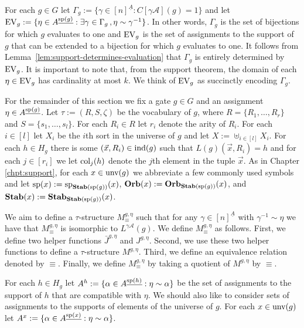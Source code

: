 \documentclass[../main/thesis.tex]{subfiles}
\begin{document}
For each $g \in G$ let $\Gamma_g:= \{\gamma \in [n]^{\underline{A}} : C[\gamma
\mathcal{A}](g) = 1 \}$ and let $\text{EV}_g := \{ \eta \in A^{\underline{\text{sp}(g)}}
: \exists \gamma \in \Gamma_g \, ,\eta \sim \gamma^{-1}\}$. In other words,
$\Gamma_g$ is the set of bijections for which $g$ evaluates to one and $\text{EV}_g$
is the set of assignments to the support of $g$ that can be extended to a
bijection for which $g$ evaluates to one. It follows from
Lemma~\ref{lem:support-determines-evaluation} that $\Gamma_g$ is entirely
determined by $\text{EV}_g$. It is important to note that, from the support theorem,
the domain of each $\eta \in \text{EV}_g$ has cardinality at most $k$. We think of
$\text{EV}_g$ as succinctly encoding $\Gamma_g$.

For the remainder of this section we fix a gate $g \in G$ and an assignment
$\eta \in A^{\underline{\text{sp}(g)}}$. Let $\tau := (R, S, \zeta)$ be the
vocabulary of $g$, where $R = \{R_1, \ldots, R_r\}$ and $S = \{s_1, \ldots,
s_l\}$. For each $R_i \in R$ let $r_i$ denote the arity of $R_i$. For each $i
\in [l]$ let $X_i$ be the $i$th sort in the universe of $g$ and let $X :=
\uplus_{i \in [l]}X_i$. For each $h \in H_g$ there is some $(\vec{x}, R_i) \in
\text{\upshape ind}(g)$ such that $L(g)(\vec{x}, R_i) = h$ and for each $j \in [r_i]$ we let
$\text{\upshape col}_{j}(h)$ denote the $j$th element in the tuple $\vec{x}$. As in Chapter
\ref{chpt:support}, for each $x \in \text{unv}(g)$ we abbreviate a few commonly
used symbols and let $\text{sp}(x) := \text{sp}_{\text{\textbf{Stab}} (\text{sp} (g))}(x)$, $\text{\textbf{Orb}}(x) :=
\text{\textbf{Orb}}_{\text{\textbf{Stab}} (\text{sp} (g))}(x)$, and $\text{\textbf{Stab}}(x) := \text{\textbf{Stab}}_{\text{\textbf{Stab}} (\text{sp} (g))}(x)$.

We aim to define a $\tau$-structure $M^{g, \eta}_{\equiv}$ such that for any
$\gamma \in [n]^{\underline{A}}$ with $\gamma^{-1} \sim \eta$ we have that
$M^{g, \eta}_{\equiv}$ is isomorphic to $L^{\gamma \mathcal{A}}(g)$. We define
$M^{g, \eta}_{\equiv}$ as follows. First, we define two helper functions
$\bar{J}^{g, \eta}$ and $J^{g, \eta}$. Second, we use these two helper functions
to define a $\tau$-structure $M^{g, \eta}$. Third, we define an equivalence
relation denoted by $\equiv$. Finally, we define $M^{g, \eta}_\equiv$ by taking
a quotient of $M^{g, \eta}$ by $\equiv$.


For each $h \in H_g$ let $A^h := \{\alpha \in A^{\underline{\text{sp}(h)}} : \eta
\sim \alpha\}$ be the set of assignments to the support of $h$ that are
compatible with $\eta$. We should also like to consider sets of assignments to
the supports of elements of the universe of $g$. For each $x \in \text{unv}(g)$
let $A^x:= \{\alpha \in A^{\underline{\text{sp}(x)}} : \eta \sim \alpha\}$.
\end{document}

